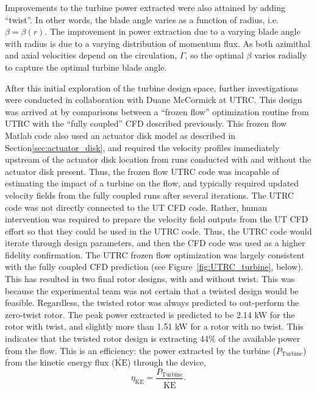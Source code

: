 Improvements to the turbine power extracted were also attained by adding
``twist''. In other words, the blade angle varies as a function of
radius, i.e. $\beta = \beta(r)$. The improvement in power extraction due
to a varying blade angle with radius is due to a varying distribution
of momentum flux. As both azimithal and axial velocities depend on the
circulation, $\Gamma$, so the optimal $\beta$ varies radially to capture
the optimal turbine blade angle. 

After this initial exploration of the turbine design space, further
investigations were conducted in collaboration with Duane McCormick at
UTRC. This design was arrived at by comparisons between a ``frozen
flow'' optimization routine from UTRC  with the ``fully coupled'' CFD
described previously. This frozen 
flow Matlab code also used an actuator disk model as described in 
Section\ref{sec:actuator_disk}, and required the velocity profiles
immediately upstream of the actuator disk location from runs conducted
with and without the actuator disk present. Thus, the frozen flow
UTRC code was incapable of estimating the impact of a turbine on the
flow, and typically required updated velocity fields from the fully
coupled runs after several iterations. 
The UTRC code was not directly connected to the UT CFD code. Rather,
human intervention was required to prepare the velocity field outputs
from the UT CFD effort so that they could be used in the UTRC
code. Thus, the UTRC code would iterate through design parameters, and
then the CFD code was used as a higher fidelity confirmation. The UTRC
frozen flow optimization was largely consistent with the fully coupled
CFD prediction (see  Figure~\ref{fig:UTRC_turbine}, below). This has
resulted in two final rotor designs, with and without twist. This was
because the experimental team was not certain that a twisted design
would be feasible. Regardless, the twisted rotor was always predicted to 
out-perform the zero-twist rotor.  
The peak power extracted is predicted to be 2.14 kW for the rotor
with twist, and slightly more than 1.51 kW for a rotor with no twist. 
This indicates that the twisted rotor design is extracting 44\% of the
available power from the flow. This is an efficiency: the power
extracted by the turbine ($P_{\text{Turbine}}$) from the kinetic energy
flux ($\dot{\text{KE}}$) through the device, 
\begin{equation}
\eta_{\dot{\text{KE}}} = \frac{P_{\text{Turbine}}}{\dot{\text{KE}}}. 
\end{equation}

